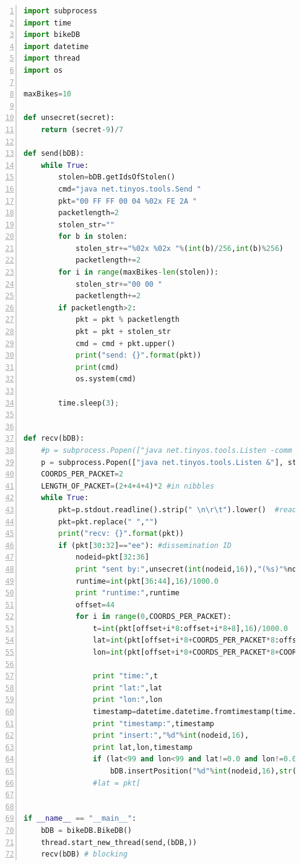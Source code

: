 \documentclass[a4paper]{article}
\begin{document}
\begin{lstlisting}[breaklines=true, numbers=left, frame=single,language=python, captionpos=b, caption={listen.py, ............}, label=lst:listen.py]
import subprocess
import time
import bikeDB
import datetime
import thread
import os

maxBikes=10

def unsecret(secret):
    return (secret-9)/7

def send(bDB):
    while True:
        stolen=bDB.getIdsOfStolen()
        cmd="java net.tinyos.tools.Send "
        pkt="00 FF FF 00 04 %02x FE 2A "
        packetlength=2
        stolen_str=""
        for b in stolen:
            stolen_str+="%02x %02x "%(int(b)/256,int(b)%256)
            packetlength+=2
        for i in range(maxBikes-len(stolen)):
            stolen_str+="00 00 "
            packetlength+=2
        if packetlength>2: 
            pkt = pkt % packetlength
            pkt = pkt + stolen_str
            cmd = cmd + pkt.upper()
            print("send: {}".format(pkt))
            print(cmd)
            os.system(cmd)

        time.sleep(3);


def recv(bDB):
    #p = subprocess.Popen(["java net.tinyos.tools.Listen -comm serial@/dev/ttyUSB1:iris &"], stdout=subprocess.PIPE, shell=True)
    p = subprocess.Popen(["java net.tinyos.tools.Listen &"], stdout=subprocess.PIPE, shell=True)  # use this WITH serialForwarder
    COORDS_PER_PACKET=2
    LENGTH_OF_PACKET=(2+4+4+4)*2 #in nibbles
    while True:
        pkt=p.stdout.readline().strip(" \n\r\t").lower()  #reads until \n
        pkt=pkt.replace(" ","")
        print("recv: {}".format(pkt))
        if (pkt[30:32]=="ee"): #dissemination ID
            nodeid=pkt[32:36]
            print "sent by:",unsecret(int(nodeid,16)),"(%s)"%nodeid
            runtime=int(pkt[36:44],16)/1000.0
            print "runtime:",runtime
            offset=44
            for i in range(0,COORDS_PER_PACKET):
                t=int(pkt[offset+i*8:offset+i*8+8],16)/1000.0
                lat=int(pkt[offset+i*8+COORDS_PER_PACKET*8:offset+i*8+COORDS_PER_PACKET*8+8],16)/1000000.0
                lon=int(pkt[offset+i*8+COORDS_PER_PACKET*8+COORDS_PER_PACKET*8:offset+i*8+COORDS_PER_PACKET*8+COORDS_PER_PACKET*8+8],16)/1000000.0
                
                print "time:",t
                print "lat:",lat
                print "lon:",lon
                timestamp=datetime.datetime.fromtimestamp(time.time()-int(runtime-t)).isoformat()
                print "timestamp:",timestamp
                print "insert:","%d"%int(nodeid,16),
                print lat,lon,timestamp
                if (lat<99 and lon<99 and lat!=0.0 and lon!=0.0):
                    bDB.insertPosition("%d"%int(nodeid,16),str(lat),str(lon),timestamp)
                #lat = pkt[


if __name__ == "__main__":
    bDB = bikeDB.BikeDB()
    thread.start_new_thread(send,(bDB,))
    recv(bDB) # blocking
\end{lstlisting}
\end{document}
